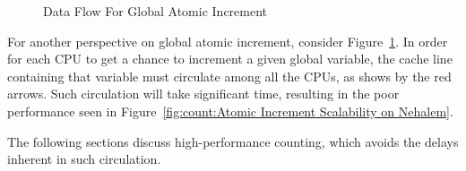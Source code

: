 \begin{figure}[tb]
\begin{center}
\end{center}
\caption{Data Flow For Global Atomic Increment}
\label{fig:count:Data Flow For Global Atomic Increment}
\end{figure}

For another perspective on global atomic increment, consider
Figure~\ref{fig:count:Data Flow For Global Atomic Increment}.
In order for each CPU to get a chance to increment a given
global variable, the cache line containing that variable must
circulate among all the CPUs, as shows by the red arrows.
Such circulation will take significant time, resulting in
the poor performance seen in
Figure~\ref{fig:count:Atomic Increment Scalability on Nehalem}.

The following sections discuss high-performance counting, which
avoids the delays inherent in such circulation.

